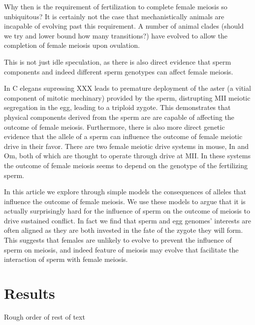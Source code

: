 \documentclass[12pt,letterpaper]{article}
\begin{document}
Why then is the requirement of fertilization to complete female meiosis so unbiquitous? 
It is certainly not the case that mechanistically animals are incapable of evolving past this requirement.
A number of animal clades (should we try and lower bound how many transitions?) have evolved
to allow the completion of female meiosis upon ovulation. 

This is not just idle speculation, as there is also direct evidence that sperm components and indeed different sperm genotypes can affect female meiosis.

In C elegans supressing XXX leads to premature deployment of the aster (a vitial component of mitotic mechinary) provided by the sperm, distrupting MII meiotic segregation in the egg, leading to a triploid zygote. 
This demonstrates that physical components derived from the sperm are are capable of affecting the outcome of female meiosis.
Furthermore, there is also more direct genetic evidence that the allele of a sperm can influence the outcome of female meiotic drive in their favor.
There are two female meiotic drive systems in mouse, In and Om, both of which are thought to operate
through drive at MII. In these systems the outcome of female meiosis seems to depend on 
the genotype of the fertilizing sperm. 


In this article we explore through simple models the consequences of alleles that influence the outcome 
of female meiosis. 
We use these models to argue that it is actually surprisingly hard for the influence of
sperm on the outcome of meiosis to drive sustained conflict. In fact we find that sperm and egg 
genomes' interests are often aligned as they are both invested in the fate of the zygote they will form.
This suggests that females are unlikely to evolve to prevent the influence of sperm on meiosis,
and indeed feature of meiosis may evolve that facilitate the interaction of sperm with female meiosis. 

\section*{Results}
Rough order of rest of text
\end{document}
